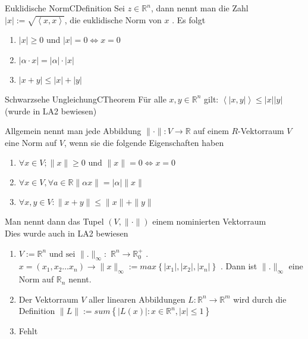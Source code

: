 \documentclass[11.5 pt, a4paper]{memoir}
\begin{document}
\begin{ibox}{Euklidische Norm}{CDefinition}
   Sei $ z \in \mathbb{R}^n $, dann nennt man die Zahl $ \left| x \right| :=
   \sqrt{ \left<x,x \right>}$, die euklidische Norm von $ x $ . Es folgt 
   \begin{enumerate}[label=\alph*)]
       \item $ \left| x \right| \geq 0  $ und $ \left| x \right| = 0 \iff x = 0$
       \item $ \left| \alpha \cdot x \right|  = \left| \alpha \right| \cdot
           \left| x \right| $ 
       \item $ \left| x + y \right| \leq \left| x \right| + \left| y \right|  $ 
   \end{enumerate}
\end{ibox}

\begin{ibox}{Schwarzsehe Ungleichung}{CTheorem}
    Für alle $ x, y \in \mathbb{R}^{n} $ gilt: $ \left< \left| x,y \right| \right>
    \leq \left| x \right| \left| y \right| $  
    \\ (wurde in LA2 bewiesen)
\end{ibox}
Allgemein nennt man jede Abbildung $ \| \cdot \| : V \to \mathbb{R} $ auf einem $
R $-Vektorraum $ V $ eine Norm auf $ V $, wenn sie die folgende Eigenschaften
haben
\begin{enumerate}[label=\alph*)]
    \item $ \forall x \in V; \| x \| \geq 0 \text{ und } \| x \|=0 \iff x=0 $ 
    \item $ \forall x \in V, \forall a \in \mathbb{R} \| \alpha x  \| =
        \left| \alpha \right| \|x \| $ 
	\item $ \forall x, y \in V : \| x+y \| \leq \|x \| + \|y \| $ 
\end{enumerate}
Man nennt dann das Tupel $ \left( V, \| \cdot \| \right)  $ einem nominierten
Vektorraum \\
Dies wurde auch in LA2 bewiesen


\begin{enumerate}[label=\alph*)]
    \item $ V := \mathbb{R}^{n} \text{ und sei } \|. \|_{\infty}:$
        $\mathbb{R}^{n} \to \mathbb{R}_{0}^+$ . $ x = \left( x_1,x_2 \dots
        x_{n}\right) \to \|x \|_{\infty}:= max \left\{ \left| x_1 \right| , \left| x_2 \right|, \left| x_{n} \right| \right\}$ . Dann ist $ \|. \|_{
    \infty}$ eine Norm auf $ \mathbb{R}_{n} $ nennt.
    \item Der Vektorraum $ V $ aller linearen Abbildungen $ L : \mathbb{R}^n
        \to \mathbb{R}^m$ wird durch die Definition $ \|L \|:= sum \left\{ 
        \left| L(x)\right| : x \in \mathbb{R}^{n}, \left| x \right| 
    \leq 1 \right\}  $ 
    \item Fehlt
\end{enumerate}
\end{document}
